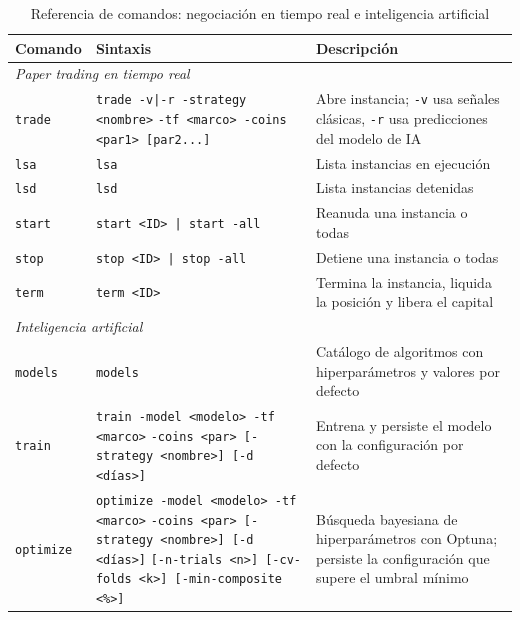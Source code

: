 \begin{table}[H]
    \centering
    \caption{Referencia de comandos: negociación en tiempo real e inteligencia artificial}
    \label{tab:comandos_b}
    \begin{tabular}{p{2.0cm} p{6.0cm} p{4.6cm}}
    \hline
    \textbf{Comando} & \textbf{Sintaxis} & \textbf{Descripción} \\
    \hline
    \multicolumn{3}{l}{\textit{Paper trading en tiempo real}} \\
    \hline
    \texttt{trade}  & \texttt{trade -v|-r -strategy <nombre>} \newline
                      \texttt{-tf <marco> -coins <par1> [par2...]}
                    & Abre instancia; \texttt{-v} usa señales clásicas,
                      \texttt{-r} usa predicciones del modelo de IA \\
    \texttt{lsa}    & \texttt{lsa}                    & Lista instancias en ejecución \\
    \texttt{lsd}    & \texttt{lsd}                    & Lista instancias detenidas \\
    \texttt{start}  & \texttt{start <ID> | start -all} & Reanuda una instancia o todas \\
    \texttt{stop}   & \texttt{stop <ID> | stop -all}   & Detiene una instancia o todas \\
    \texttt{term}   & \texttt{term <ID>}
                    & Termina la instancia, liquida la posición y libera el capital \\
    \hline
    \multicolumn{3}{l}{\textit{Inteligencia artificial}} \\
    \hline
    \texttt{models}   & \texttt{models}
                      & Catálogo de algoritmos con hiperparámetros y valores por defecto \\
    \texttt{train}    & \texttt{train -model <modelo> -tf <marco>} \newline
                        \texttt{-coins <par> [-strategy <nombre>] [-d <días>]}
                      & Entrena y persiste el modelo con la configuración por defecto \\
    \texttt{optimize} & \texttt{optimize -model <modelo> -tf <marco>} \newline
                        \texttt{-coins <par> [-strategy <nombre>] [-d <días>]} \newline
                        \texttt{[-n-trials <n>] [-cv-folds <k>] [-min-composite <\%>]}
                      & Búsqueda bayesiana de hiperparámetros con Optuna;
                        persiste la configuración que supere el umbral mínimo \\
    \hline
    \end{tabular}
\end{table}

